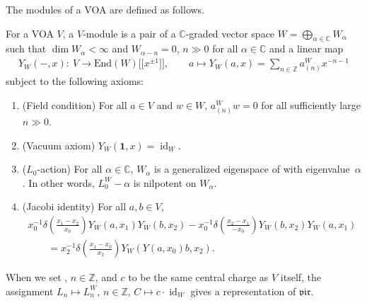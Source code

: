 \documentclass[pdftex]{sigma}
\numberwithin{equation}{section}
\newcommand{\End}{\mathrm{End}}
\newcommand{\id}{\operatorname{id}}
\newcommand{\bC}{\mathbb{C}}
\newcommand{\bZ}{\mathbb{Z}}
\newcommand{\voaV}{V}
\newcommand{\voagen}{V}
\newcommand{\voamodgen}{W}
\newcommand{\voavac}{\mathbf{1}}
\newcommand{\voaY}{Y}
\newcommand{\voaconf}{\omega}
\newcommand{\vir}{\mathfrak{vir}}
\begin{document}
The modules of a VOA are defined as follows.
\begin{defn}
For a VOA $\voagen$, a $\voagen$-module is a pair of a $\bC$-graded vector space $\voamodgen=\bigoplus_{\alpha \in\bC}\voamodgen_{\alpha}$ such that $\dim\voamodgen_{\alpha}<\infty$ and $W_{\alpha-n}=0$, $n\gg 0$ for all $\alpha\in\bC$ and a linear map
\begin{gather*}
	\voaY_{\voamodgen}(-,x)\colon \ \voagen \to \End (\voamodgen) \big[\big[x^{\pm 1}\big]\big], \qquad
	 a \mapsto \voaY_{\voamodgen}(a,x) = \sum_{n\in\bZ}a^{\voamodgen}_{(n)}x^{-n-1}
\end{gather*}
subject to the following axioms:
\begin{enumerate}\itemsep=0pt
\item[(1)] 	(Field condition) For all $a\in \voagen$ and $w\in \voamodgen$, $a^{\voamodgen}_{(n)}w=0$ for all sufficiently large $n\gg 0$.
\item[(2)] 	(Vacuum axiom) $\voaY_{\voamodgen}(\voavac,x)=\id_{\voamodgen}$.
\item[(3)] 	($L_{0}$-action) For all $\alpha\in\bC$, $\voamodgen_{\alpha}$ is a generalized eigenspace of \smash{$L_{0}^{\voamodgen}\coloneqq\voaconf^{\voamodgen}_{(1)}$} with eigenvalue~$\alpha$. In other words, $L^{\voamodgen}_{0}-\alpha$ is nilpotent on $\voamodgen_{\alpha}$.
\item[(4)] 	(Jacobi identity) For all $a,b\in \voaV$,
	\begin{gather*}
 x_{0}^{-1}\delta \left(\frac{x_{1}-x_{2}}{x_{0}}\right)\voaY_{\voamodgen}(a,x_{1})\voaY_{\voamodgen} (b,x_{2})-x_{0}^{-1}\delta\left(\frac{x_{2}-x_{1}}{-x_{0}}\right)\voaY_{\voamodgen} (b,x_{2})\voaY_{\voamodgen}(a,x_{1}) \\
\qquad = x_{2}^{-1}\delta\left(\frac{x_{1}-x_{0}}{x_{2}}\right)\voaY_{\voamodgen}\left(\voaY(a,x_{0})b,x_{2}\right).
\end{gather*}
\end{enumerate}
\end{defn}

When we set \smash{$L^{\voamodgen}_{n}=\voaconf^{\voamodgen}_{(n+1)}$}, $n\in\bZ$,
and $c$ to be the same central charge as $\voagen$ itself,
the assignment $L_{n}\mapsto L_{n}^{\voamodgen}$, $n\in\bZ$, $C\mapsto c\cdot \id_{\voamodgen}$ gives a representation of $\vir$.
\end{document}
